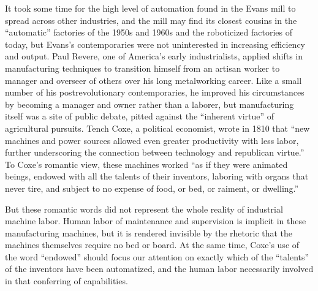 It took some time for the high level of automation found in the Evans
mill to spread across other industries, and the mill may find its
closest cousins in the ``automatic'' factories of the 1950s and 1960s
and the roboticized factories of today, but Evans's contemporaries
were not uninterested in increasing efficiency and output. Paul
Revere, one of America's early industrialists, applied shifts in
manufacturing techniques to transition himself from an
artisan worker to manager and overseer of others over his long
metalworking career.\cite[p. 187]{martello} Like a small number of his postrevolutionary
contemporaries, he improved his circumstances by becoming a manager
and owner rather than a laborer, but manufacturing itself was a site of public
debate, pitted against the ``inherent virtue'' of agricultural pursuits.
Tench Coxe, a political economist, wrote in 1810 that ``new machines
and power sources allowed even greater productivity with less labor,
further underscoring the connection between technology and republican
virtue.''\cite[p. 217]{martello} To Coxe's romantic view, these machines  worked ``as if they
were animated beings, endowed with all the talents of their inventors,
laboring with organs that never tire, and subject to no expense of
food, or bed, or raiment, or dwelling.''\cite[p. xxv]{coxe}

But these romantic words did not represent the whole reality of
industrial machine labor. Human labor of
maintenance and supervision is implicit in these manufacturing
machines, but it is rendered invisible by the rhetoric that the
machines themselves require no bed or board. At the same time, Coxe's
use of the word ``endowed'' should focus our attention on exactly which
of the ``talents'' of the inventors have been automatized, and the human
labor necessarily involved in that conferring of capabilities. 

